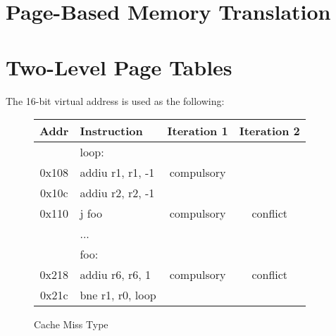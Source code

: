 \documentclass[10pt]{article}
\begin{document}
\cleardoublepage
\section{Page-Based Memory Translation}

\section{Two-Level Page Tables}
The 16-bit virtual address is used as the following:
\begin{figure}[H]
\centering
\begin{tabular}{clcc}
\hline
\textbf{Addr} &\textbf{Instruction}& \textbf{Iteration 1} & \textbf{Iteration 2}\\
\hline
& loop: & & \\
0x108 & \tableindent addiu r1, r1, -1 & compulsory & \\
0x10c & \tableindent addiu r2, r2, -1 & 		   & \\
0x110 & \tableindent j foo			  & compulsory & conflict \\
	  & ...							  & 		   & \\
	  & foo:						  & 		   & \\
0x218 & \tableindent addiu r6, r6, 1  & compulsory & conflict \\
0x21c & \tableindent bne r1, r0, loop & 	       & \\
\hline
\end{tabular}
\caption{Cache Miss Type}
\end{figure}
\end{document}
